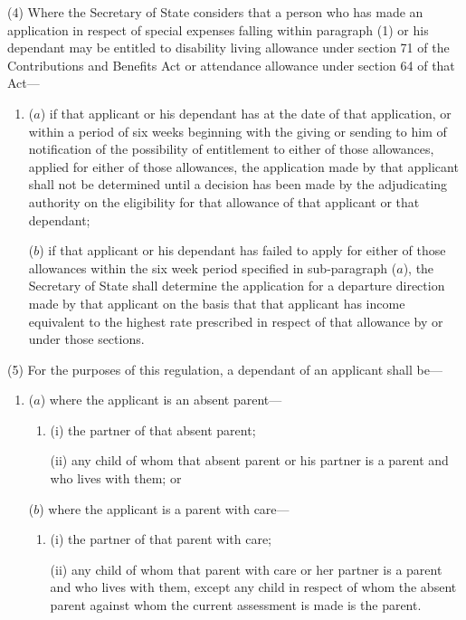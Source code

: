 \documentclass[a4paper]{article}
\begin{document}
(4) Where the Secretary of State considers that a person who has made an
application in respect of special expenses falling within paragraph (1) or his
dependant may be entitled to disability living allowance under section 71 of the
Contributions and Benefits Act or attendance allowance under section 64 of that
Act—
\begin{enumerate}\item[]
($a$) if that applicant or his dependant has at the date of that application, or
within a period of six weeks beginning with the giving or sending to him of
notification of the possibility of entitlement to either of those allowances,
applied for either of those allowances, the application made by that applicant
shall not be determined until a decision has been made by the adjudicating
authority on the eligibility for that allowance of that applicant or that
dependant;

($b$) if that applicant or his dependant has failed to apply for either of those
allowances within the six week period specified in sub-paragraph ($a$), the
Secretary of State shall determine the application for a departure direction
made by that applicant on the basis that that applicant has income equivalent to
the highest rate prescribed in respect of that allowance by or under those
sections.
\end{enumerate}

(5) For the purposes of this regulation, a dependant of an applicant shall be—
\begin{enumerate}\item[]
($a$) where the applicant is an absent parent—
\begin{enumerate}\item[]
(i) the partner of that absent parent;

(ii) any child of whom that absent parent or his partner is a parent and who
lives with them; or
\end{enumerate}

($b$) where the applicant is a parent with care—
\begin{enumerate}\item[]
(i) the partner of that parent with care;

(ii) any child of whom that parent with care or her partner is a parent and who
lives with them, except any child in respect of whom the absent parent against
whom the current assessment is made is the parent.
\end{enumerate}
\end{enumerate}
\end{document}
